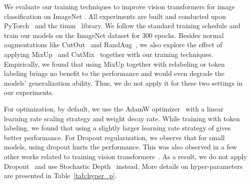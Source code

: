 \documentclass[10pt,twocolumn,letterpaper]{article}
\begin{document}
We evaluate our training techniques to improve vision transformers for image classification on ImageNet \cite{deng2009imagenet}.
All experiments are built and conducted upon PyTorch~\cite{paszke2019pytorch} and the timm~\cite{rw2019timm} library.
We follow the standard training schedule and train our models on the ImageNet dataset for 300 epochs.
Besides normal augmentations like CutOut~\cite{zhong2020random} and RandAug~\cite{cubuk2020randaugment}, 
we also explore the effect of applying MixUp~\cite{zhang2017mixup} and CutMix~\cite{yun2019cutmix} together
with our training techniques.
Empirically, we found that using MixUp together with relabeling or token labeling brings no benefit to
the performance and would even degrade the models' generalization ability.
Thus, we do not apply it for these two settings in our experiments.

For optimization, by default, we use the AdamW optimizer~\cite{loshchilov2017decoupled} 
with a linear learning rate scaling strategy  and 
weight decay rate. 
While training with token labeling, we found that using a slightly larger learning rate strategy of 
 gives better performance.
For Dropout regularization, we observe that for small models, using dropout hurts the performance.
This was also observed in a few other works related to training vision transformers~\cite{touvron2020training, touvron2021going, yuan2021tokens}.
As a result, we do not apply Dropout~\cite{srivastava2014dropout} and use 
Stochastic Depth~\cite{huang2016deep} instead.
More details on hyper-parameters are presented in Table~\ref{tab:hyper_p}.
\end{document}
